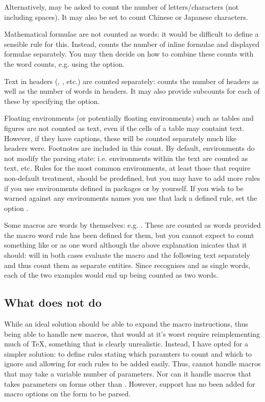 \documentclass{article}
\begin{document}
Alternatively, \TeXcount{} may be asked to count the number of letters/characters (not including spaces). It may also be set to count Chinese or Japanese characters.

Mathematical formulae are not counted as words: it would be difficult to define a sensible rule for this. Instead, \TeXcount{} counts the number of inline formulae and displayed formulae separately. You may then decide on how to combine these counts with the word counts, e.g. using the  option.

Text in headers (, , etc.) are counted separately: \TeXcount{} counts the number of headers as well as the number of words in headers. It may also provide subcounts for each of these by specifying the  option.

Floating environments (or potentially floating environments) such as tables and figures are not counted as text, even if the cells of a table may containt text. However, if they have captions, these will be counted separately much like headers were. Footnotes are included in this count. By default, environments do not modify the parsing state: i.e. environments within the text are counted as text, etc. Rules for the most common environments, at least those that require non-default treatment, should be predefined, but you may have to add more rules if you use environments defined in packages or by yourself. If you wish to be warned against any environments names you use that lack a defined rule, set the option .

Some macros are words by themselves: e.g. . These are counted as words provided the macro word rule has been defined for them, but you cannot expect \TeXcount{} to count something like  or  as one word although the above explanation inicates that it should: \TeXcount{} will in both cases evaluate the macro and the following text separately and thus count them as separate entities. Since \TeXcount{} recognises  and  as single words, each of the two examples would end up being counted as two words.


\subsection{What \TeXcount{} does not do}

While an ideal solution should be able to expand the macro instructions, thus being able to handle new macros, that would at it's worst require reimplementing much of \TeX{}, something that is clearly unrealistic. Instead, I have opted for a simpler solution: to define rules stating which paramters to count and which to ignore and allowing for such rules to be added easily. Thus, \TeXcount{} cannot handle macros that may take a variable number of parameters. Nor can it handle macros that takes parameters on forms other than . However, support has no been added for macro options on the form \code{[\ldots]} to be parsed.
\end{document}
